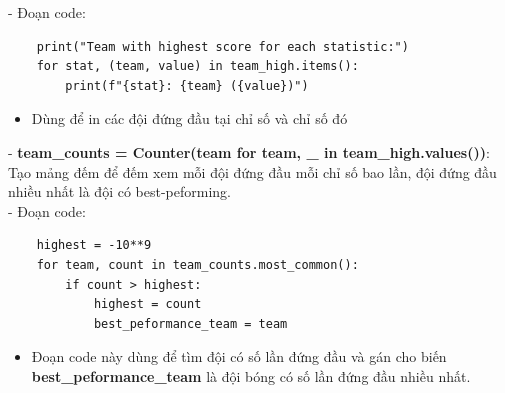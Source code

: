 - Đoạn code:
    \begin{verbatim}
    print("Team with highest score for each statistic:")
    for stat, (team, value) in team_high.items():
        print(f"{stat}: {team} ({value})")
    \end{verbatim}
    \begin{itemize}
        \item Dùng để in các đội đứng đầu tại chỉ số và chỉ số đó
    \end{itemize}
- \textbf{team\_counts = Counter(team for team, \_ in team\_high.values())}: Tạo mảng đếm để đếm xem mỗi đội đứng đầu mỗi chỉ số bao lần, đội đứng đầu nhiều nhất là đội có best-peforming.\\
- Đoạn code:
    \begin{verbatim}
    highest = -10**9
    for team, count in team_counts.most_common():
        if count > highest:
            highest = count
            best_peformance_team = team 
    \end{verbatim}
    \begin{itemize}
        \item Đoạn code này dùng để tìm đội có số lần đứng đầu và gán cho biến \textbf{best\_peformance\_team} là đội bóng có số lần đứng đầu nhiều nhất.
    \end{itemize}